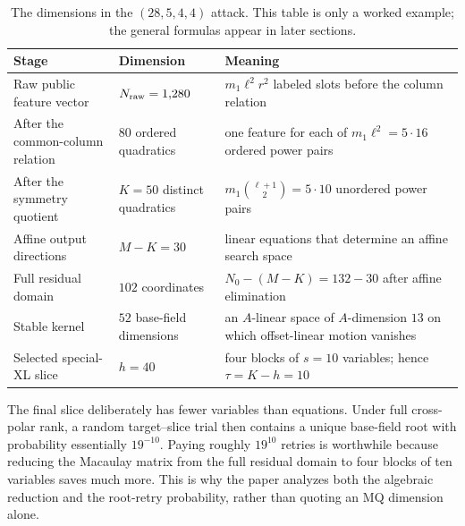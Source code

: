 \documentclass[11pt]{article}
\begin{document}
\begin{table}[H]
\centering
\caption{The dimensions in the $(28,5,4,4)$ attack.  This table is only a
worked example; the general formulas appear in later sections.}
\label{tab:running-example}
\small
\renewcommand{\arraystretch}{1.12}
\begin{tabularx}{0.96\textwidth}{@{}>{\raggedright\arraybackslash}p{}>{\centering\arraybackslash}p{}X@{}}
\toprule
Stage & Dimension & Meaning\\
\midrule
Raw public feature vector & $N_{\rm raw}=1{,}280$ & $m_1\ell^2r^2$ labeled slots before
the column relation\\
After the common-column relation & $80$ ordered quadratics & one feature for
each of $m_1\ell^2=5\cdot16$ ordered power pairs\\
After the symmetry quotient & $K=50$ distinct quadratics &
$m_1\binom{\ell+1}{2}=5\cdot10$ unordered power pairs\\
Affine output directions & $M-K=30$ & linear equations that determine an
affine search space\\
Full residual domain & $102$ coordinates & $N_0-(M-K)=132-30$ after affine
elimination\\
Stable kernel & $52$ base-field dimensions & an $A$-linear space of
$A$-dimension $13$ on which offset-linear motion vanishes\\
Selected special-XL slice & $h=40$ & four blocks of $s=10$ variables; hence
$\tau=K-h=10$\\
\bottomrule
\end{tabularx}
\end{table}

The final slice deliberately has fewer variables than equations.  Under full
cross-polar rank, a random target--slice trial then contains a unique
base-field root with probability essentially $19^{-10}$.  Paying roughly
$19^{10}$ retries is worthwhile because reducing the Macaulay matrix from the
full residual domain to four blocks of ten variables saves much more.  This is
why the paper analyzes both the algebraic reduction and the root-retry
probability, rather than quoting an MQ dimension alone.
\end{document}
